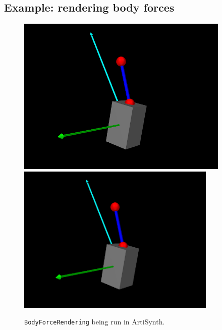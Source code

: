 \subsection{Example: rendering body forces}
\label{RenderingBodyForces:sec}

\begin{figure}[ht]
\begin{center}
\iflatexml
 \includegraphics[]{images/BodyForceRendering}
\else
 \includegraphics[width=3.75in]{images/BodyForceRendering}
\fi
\end{center}
\caption{{\tt BodyForceRendering} being run in ArtiSynth.}
\label{BodyForceRendering:fig}
\end{figure}

